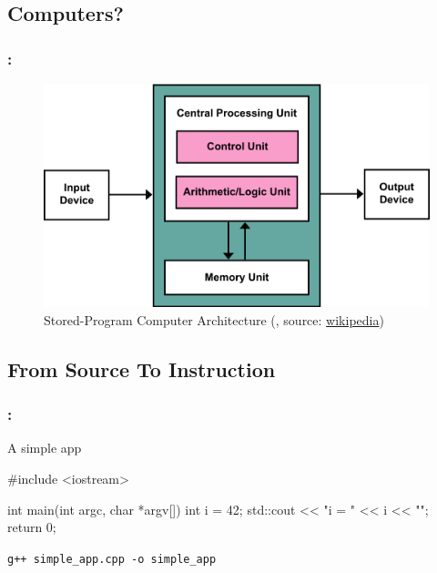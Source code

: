 \documentclass[9pt,xcolor=table]{beamer}
\begin{document}
\subsection{Computers?}
\begin{frame}[c]
\frametitle{\insertsectionhead{}: \insertsubsection{}}
\begin{figure}[htb]
\includegraphics[height=0.65\textheight]{img/Von_Neumann_Architecture}\\[12pt]\Large
Stored-Program Computer Architecture (\cite{VonNeumann}, source: \href{http://en.wikipedia.org/wiki/Von_Neumann_architecture}{wikipedia})
\end{figure}
\end{frame}

\subsection{From Source To Instruction}
\begin{frame}[fragile]
\frametitle{\insertsectionhead{}: \insertsubsection{}}
\begin{block}{A simple app}
  \small
  \begin{pyglist}[language=c++,numbers=left,style=emacs]
  #include <iostream>

  int main(int argc, char *argv[])
  {
    int i = 42;
    std::cout << "i = " << i << "\n";
    return 0;
  }
  \end{pyglist}
\end{block}
\pause
\begin{block}{\texttt{g++ simple\_app.cpp -o simple\_app}}
  \small
    
\end{block}
\end{frame}
\end{document}
